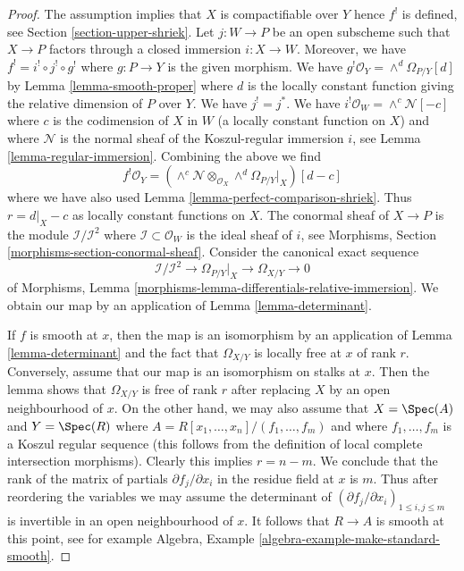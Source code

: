 \begin{proof}
The assumption implies that $X$ is compactifiable over $Y$ hence $f^!$
is defined, see Section \ref{section-upper-shriek}.
Let $j : W \to P$ be an open subscheme such that
$X \to P$ factors through a closed immersion $i : X \to W$.
Moreover, we have $f^! = i^! \circ j^! \circ g^!$ where
$g : P \to Y$ is the given morphism.
We have $g^!\mathcal{O}_Y = \wedge^d\Omega_{P/Y}[d]$ by
Lemma \ref{lemma-smooth-proper} where $d$ is the locally
constant function giving the relative dimension of $P$ over $Y$.
We have $j^! = j^*$. We have $i^!\mathcal{O}_W = \wedge^c\mathcal{N}[-c]$
where $c$ is the codimension of $X$ in $W$ (a locally constant
function on $X$) and where $\mathcal{N}$ is the normal sheaf of
the Koszul-regular immersion $i$, see Lemma \ref{lemma-regular-immersion}.
Combining the above we find
$$
f^!\mathcal{O}_Y =
\left(\wedge^c\mathcal{N} \otimes_{\mathcal{O}_X}
\wedge^d\Omega_{P/Y}|_X\right)[d - c]
$$
where we have also used Lemma \ref{lemma-perfect-comparison-shriek}.
Thus $r = d|_X - c$ as locally constant functions on $X$.
The conormal sheaf of $X \to P$ is the module
$\mathcal{I}/\mathcal{I}^2$ where $\mathcal{I} \subset \mathcal{O}_W$
is the ideal sheaf of $i$, see
Morphisms, Section \ref{morphisms-section-conormal-sheaf}.
Consider the canonical exact sequence
$$
\mathcal{I}/\mathcal{I}^2 \to
\Omega_{P/Y}|_X \to \Omega_{X/Y} \to 0
$$
of Morphisms, Lemma \ref{morphisms-lemma-differentials-relative-immersion}.
We obtain our map by an application of Lemma \ref{lemma-determinant}.

\medskip\noindent
If $f$ is smooth at $x$, then the map is an isomorphism by an application of
Lemma \ref{lemma-determinant}
and the fact that $\Omega_{X/Y}$ is locally free at $x$
of rank $r$. Conversely, assume that our map is an isomorphism on stalks
at $x$. Then the lemma shows that $\Omega_{X/Y}$ is free of rank $r$
after replacing $X$ by an open neighbourhood of $x$.
On the other hand, we may also assume that $X = \Spec(A)$ and
$Y = \Spec(R)$ where $A = R[x_1, \ldots, x_n]/(f_1, \ldots, f_m)$
and where $f_1, \ldots, f_m$ is a Koszul regular sequence
(this follows from the definition of local complete intersection morphisms).
Clearly this implies $r = n - m$. We conclude that the rank of the matrix
of partials $\partial f_j/\partial x_i$ in the residue field at $x$ is $m$.
Thus after reordering the variables we may assume
the determinant of $(\partial f_j/\partial x_i)_{1 \leq i, j \leq m}$
is invertible in an open neighbourhood of $x$. It follows
that $R \to A$ is smooth at this point, see for example
Algebra, Example \ref{algebra-example-make-standard-smooth}.
\end{proof}

